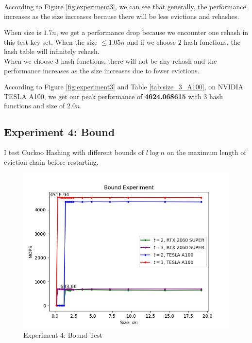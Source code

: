 \documentclass[10pt,twocolumn,letterpaper]{article}
\begin{document}
According to Figure \ref{fig:experiment3}, we can see that generally, the performance increases as the size increases because there will be less evictions and rehashes. 

When size is $1.7n$, we get a performance drop because we encounter one rehash in this test key set. When the size $\leq 1.05n$ and if we choose $2$ hash functions, the hash table will infinitely rehash.\\

When we choose $3$ hash functions, there will not be any rehash and the performance increases as the size increases due to fewer evictions.

According to Figure \ref{fig:experiment3} and Table \ref{tab:size_3_A100}, on NVIDIA TESLA A100, we get our peak performance of \textbf{4624.068615} with $3$ hash functions and size of $2.0n$.

\subsection{Experiment 4: Bound}

I test Cuckoo Hashing with different bounds of $l \log n$ on the maximum length of eviction chain before restarting.

\begin{figure}[h]
    \centering
    \includegraphics[scale=0.5]{figures/4.png}
    \caption{Experiment 4: Bound Test}
    \label{fig:experiment4}
\end{figure}

\vspace{1.23pt}
\end{document}

